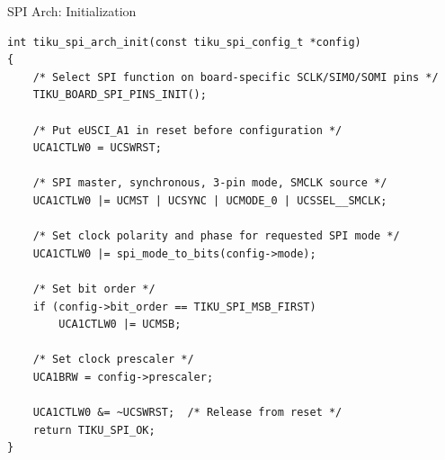 \documentclass[aspectratio=169, 10pt]{beamer}
\begin{document}
\begin{frame}[fragile]{SPI Arch: Initialization}
\begin{lstlisting}[style=cstyle, title={arch/msp430/tiku\_spi\_arch.c --- tiku\_spi\_arch\_init()}]
int tiku_spi_arch_init(const tiku_spi_config_t *config)
{
    /* Select SPI function on board-specific SCLK/SIMO/SOMI pins */
    TIKU_BOARD_SPI_PINS_INIT();

    /* Put eUSCI_A1 in reset before configuration */
    UCA1CTLW0 = UCSWRST;

    /* SPI master, synchronous, 3-pin mode, SMCLK source */
    UCA1CTLW0 |= UCMST | UCSYNC | UCMODE_0 | UCSSEL__SMCLK;

    /* Set clock polarity and phase for requested SPI mode */
    UCA1CTLW0 |= spi_mode_to_bits(config->mode);

    /* Set bit order */
    if (config->bit_order == TIKU_SPI_MSB_FIRST)
        UCA1CTLW0 |= UCMSB;

    /* Set clock prescaler */
    UCA1BRW = config->prescaler;

    UCA1CTLW0 &= ~UCSWRST;  /* Release from reset */
    return TIKU_SPI_OK;
}
\end{lstlisting}
\end{frame}
\end{document}
